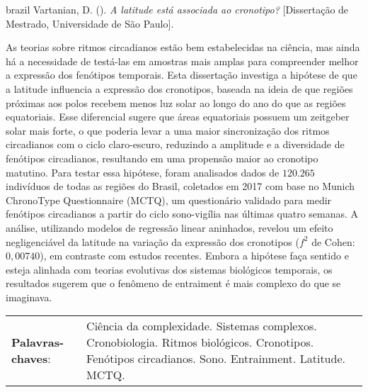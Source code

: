 \begin{resumoenv}[\resumoestrangeironame]
\begin{otherlanguage*}{brazil}
Vartanian, D. ({\imprimirdata}). \textit{A latitude está associada ao cronotipo?} [Dissertação de Mestrado, Universidade de São Paulo].


As teorias sobre ritmos circadianos estão bem estabelecidas na ciência,
mas ainda há a necessidade de testá-las em amostras mais amplas para
compreender melhor a expressão dos fenótipos temporais. Esta dissertação
investiga a hipótese de que a latitude influencia a expressão dos
cronotipos, baseada na ideia de que regiões próximas aos polos recebem
menos luz solar ao longo do ano do que as regiões equatoriais. Esse
diferencial sugere que áreas equatoriais possuem um zeitgeber solar mais
forte, o que poderia levar a uma maior sincronização dos ritmos
circadianos com o ciclo claro-escuro, reduzindo a amplitude e a
diversidade de fenótipos circadianos, resultando em uma propensão maior
ao cronotipo matutino. Para testar essa hipótese, foram analisados dados
de \(120.265\) indivíduos de todas as regiões do Brasil, coletados em
2017 com base no Munich ChronoType Questionnaire (MCTQ), um questionário
validado para medir fenótipos circadianos a partir do ciclo sono-vigília
nas últimas quatro semanas. A análise, utilizando modelos de regressão
linear aninhados, revelou um efeito negligenciável da latitude na
variação da expressão dos cronotipos (\(f^2\) de Cohen: \(0,00740\)), em
contraste com estudos recentes. Embora a hipótese faça sentido e esteja
alinhada com teorias evolutivas dos sistemas biológicos temporais, os
resultados sugerem que o fenômeno de entraiment é mais complexo do que
se imaginava.


\begin{tabular}{p{3.6cm} p{12.3cm}}
  \textbf{Palavras-chaves}: &  Ciência da complexidade. Sistemas complexos. Cronobiologia. Ritmos biológicos. Cronotipos. Fenótipos circadianos. Sono. Entrainment. Latitude. MCTQ.
\end{tabular}
\end{otherlanguage*}
\end{resumoenv}


\tableofcontents*
\cleardoublepage
